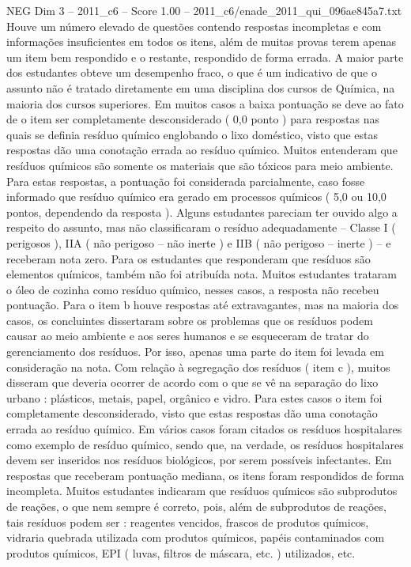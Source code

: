 \begin{textsample}{NEG Dim 3 – 2011\_c6 – Score 1.00 – 2011\_c6/enade\_2011\_qui\_096ae845a7.txt}
Houve um número elevado de questões contendo respostas incompletas e com informações insuficientes em todos os itens, além de muitas provas terem apenas um item bem respondido e o restante, respondido de forma errada.
A maior parte dos estudantes obteve um desempenho fraco, o que é um indicativo de que o assunto não é tratado diretamente em uma disciplina dos cursos de Química, na maioria dos cursos superiores.
Em muitos casos a baixa pontuação se deve ao fato de o item ser completamente desconsiderado ( 0,0 ponto ) para respostas nas quais se definia resíduo químico englobando o lixo doméstico, visto que estas respostas dão uma conotação errada ao resíduo químico.
Muitos entenderam que resíduos químicos são somente os materiais que são tóxicos para meio ambiente.
Para estas respostas, a pontuação foi considerada parcialmente, caso fosse informado que resíduo químico era gerado em processos químicos ( 5,0 ou 10,0 pontos, dependendo da resposta ).
Alguns estudantes pareciam ter ouvido algo a respeito do assunto, mas não classificaram o resíduo adequadamente – Classe I ( perigosos ), IIA ( não perigoso – não inerte ) e IIB ( não perigoso – inerte ) – e receberam nota zero.
Para os estudantes que responderam que resíduos são elementos químicos, também não foi atribuída nota.
Muitos estudantes trataram o óleo de cozinha como resíduo químico, nesses casos, a resposta não recebeu pontuação.
Para o item b houve respostas até extravagantes, mas na maioria dos casos, os concluintes dissertaram sobre os problemas que os resíduos podem causar ao meio ambiente e aos seres humanos e se esqueceram de tratar do gerenciamento dos resíduos.
Por isso, apenas uma parte do item foi levada em consideração na nota.
Com relação à segregação dos resíduos ( item c ), muitos disseram que deveria ocorrer de acordo com o que se vê na separação do lixo urbano : plásticos, metais, papel, orgânico e vidro.
Para estes casos o item foi completamente desconsiderado, visto que estas respostas dão uma conotação errada ao resíduo químico.
Em vários casos foram citados os resíduos hospitalares como exemplo de resíduo químico, sendo que, na verdade, os resíduos hospitalares devem ser inseridos nos resíduos biológicos, por serem possíveis infectantes.
Em respostas que receberam pontuação mediana, os itens foram respondidos de forma incompleta.
Muitos estudantes indicaram que resíduos químicos são subprodutos de reações, o que nem sempre é correto, pois, além de subprodutos de reações, tais resíduos podem ser : reagentes vencidos, frascos de produtos químicos, vidraria quebrada utilizada com produtos químicos, papéis contaminados com produtos químicos, EPI ( luvas, filtros de máscara, etc. ) utilizados, etc.

\end{textsample}
